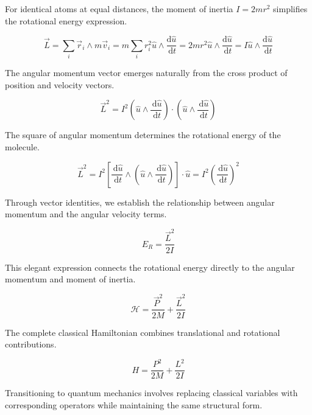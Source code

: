 \documentclass[italian]{HKNdocument}
\begin{document}
For identical atoms at equal distances, the moment of inertia $I=2mr^2$ simplifies the rotational energy expression.

\begin{equation}
\vec{L}=\sum_{i} \vec{r}_{i} \wedge m \vec{v}_{i}=m \sum_{i} r_{i}^{2} \hat{u} \wedge \frac{\mathrm{d} \hat{u}}{\, \mathrm{d} t}=2 m r^{2} \hat{u} \wedge \frac{\mathrm{d} \hat{u}}{\, \mathrm{d} t}=I \hat{u} \wedge \frac{\mathrm{d} \hat{u}}{\, \mathrm{d} t}
\end{equation}

The angular momentum vector emerges naturally from the cross product of position and velocity vectors.

\begin{equation}
\vec{L}^{2}=I^{2}\left(\hat{u} \wedge \frac{\, \mathrm{d} \hat{u}}{\, \mathrm{d} t}\right) \cdot\left(\hat{u} \wedge \frac{\, \mathrm{d} \hat{u}}{\, \mathrm{d} t}\right)
\end{equation}

The square of angular momentum determines the rotational energy of the molecule.

\begin{equation}
\vec{L}^{2}=I^{2}\left[\frac{\, \mathrm{d} \hat{u}}{\, \mathrm{d} t} \wedge\left(\hat{u} \wedge \frac{\, \mathrm{d} \hat{u}}{\, \mathrm{d} t}\right)\right] \cdot \hat{u}=I^{2}\left(\frac{\, \mathrm{d} \hat{u}}{\, \mathrm{d} t}\right)^{2}
\end{equation}

Through vector identities, we establish the relationship between angular momentum and the angular velocity terms.

\begin{equation}
E_{R}=\frac{\vec{L}^{2}}{2 I}
\end{equation}

This elegant expression connects the rotational energy directly to the angular momentum and moment of inertia.

\begin{equation}
\mathcal{H}=\frac{\vec{P}^{2}}{2 M}+\frac{\vec{L}^{2}}{2 I}
\end{equation}

The complete classical Hamiltonian combines translational and rotational contributions.

\begin{equation}
H=\frac{P^{2}}{2 M}+\frac{L^{2}}{2 I}
\end{equation}

Transitioning to quantum mechanics involves replacing classical variables with corresponding operators while maintaining the same structural form.
\end{document}
